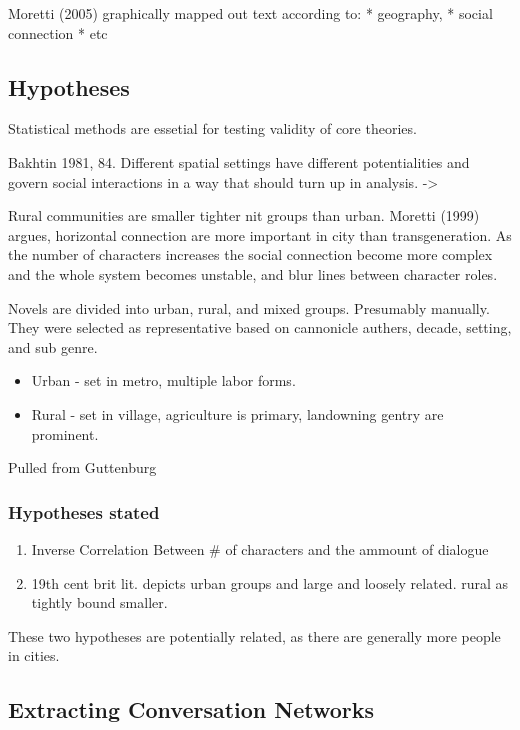 \documentclass{report}\usepackage[]{graphicx}\usepackage[]{color}
\begin{document}
Moretti (2005) graphically mapped out text according to: * geography, *
social connection * etc

\subsection{Hypotheses}

Statistical methods are essetial for testing validity of core theories.

Bakhtin 1981, 84. Different spatial settings have different
potentialities and govern social interactions in a way that should turn
up in analysis. -\textgreater{ Rural communities are smaller tighter
nit groups than urban. Moretti (1999) argues, horizontal connection are
more important in city than transgeneration. As the number of characters
increases the social connection become more complex and the whole system
becomes unstable, and blur lines between character roles.

Novels are divided into urban, rural, and mixed groups. Presumably
manually. They were selected as representative based on cannonicle
authers, decade, setting, and sub genre.

\begin{itemize}
\item
  Urban - set in metro, multiple labor forms.
\item
  Rural - set in village, agriculture is primary, landowning gentry are prominent.
\end{itemize}

Pulled from Guttenburg

\subsubsection{Hypotheses stated}

\begin{enumerate}
\item
  Inverse Correlation Between \# of characters and the ammount of dialogue
\item
  19th cent brit lit. depicts urban groups and large and loosely related. rural as tightly bound smaller.
\end{enumerate}

These two hypotheses are potentially related, as there are generally
more people in cities.

\subsection{Extracting Conversation Networks}

}
\end{document}
